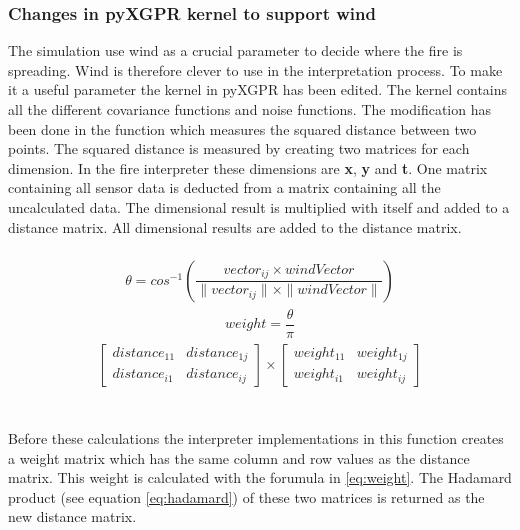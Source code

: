 \subsubsection{Changes in pyXGPR kernel to support wind}
The simulation use wind as a crucial parameter to decide where the fire is spreading. Wind is therefore clever to use in the interpretation process. To make it a useful parameter the kernel in pyXGPR has been edited. The kernel contains all the different covariance functions and noise functions. The modification has been done in the function which measures the squared distance between two points. The squared distance is measured by creating two matrices for each dimension. In the fire interpreter these dimensions are \textbf{x}, \textbf{y} and \textbf{t}. One matrix containing all sensor data is deducted from a matrix containing all the uncalculated data. The dimensional result is multiplied with itself and added to a distance matrix. All dimensional results are added to the distance matrix. 
\\\\
\begin{eqnarray}
\theta = cos^{-1}\left(\dfrac{vector_{ij} \times windVector}{\|vector_{ij}\| \times \|windVector\| } \right) 
\label{eq:int-angle}
\end{eqnarray}
\begin{eqnarray}
weight = \dfrac{\theta}{\pi}
\label{eq:weight}
\end{eqnarray}
\begin{eqnarray}
\begin{bmatrix} distance_{11} & distance_{1j} \\ distance_{i1} & distance_{ij} \end{bmatrix} \times 
\begin{bmatrix} weight_{11} & weight_{1j} \\ weight_{i1} & weight_{ij} \end{bmatrix}
\label{eq:hadamard}
\end{eqnarray}
\\\\
Before these calculations the interpreter implementations in this function creates a weight matrix which has the same column and row values as the distance matrix. This weight is calculated with the forumula in \ref{eq:weight}. The Hadamard\cite{hadamard} product (see equation \ref{eq:hadamard}) of these two matrices is returned as the new distance matrix. 
\\\\
